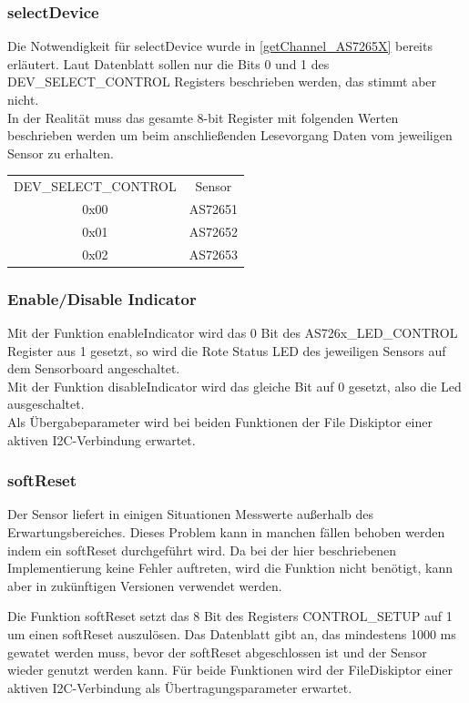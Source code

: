 \subsubsection{selectDevice}
Die Notwendigkeit für selectDevice wurde in \ref{getChannel_AS7265X} bereits erläutert.
Laut Datenblatt sollen nur die Bits 0 und 1 des DEV\_SELECT\_CONTROL Registers beschrieben werden, das stimmt aber nicht.\\
In der Realität muss das gesamte 8-bit Register mit folgenden Werten beschrieben werden um beim anschließenden Lesevorgang Daten vom jeweiligen Sensor zu erhalten.
\begin{center}
\begin{tabular}{ c c }
 	DEV\_SELECT\_CONTROL & Sensor \\ 
 	0x00 & AS72651 \\  
 	0x01 & AS72652 \\
 	0x02 & AS72653 \\  
\end{tabular}
\end{center}

\subsubsection{Enable/Disable Indicator}
Mit der Funktion enableIndicator wird das 0 Bit des AS726x\_LED\_CONTROL Register aus 1 gesetzt, so wird die Rote Status LED des jeweiligen Sensors auf dem Sensorboard angeschaltet.\\
Mit der Funktion disableIndicator wird das gleiche Bit auf 0 gesetzt, also die Led ausgeschaltet.\\
Als Übergabeparameter wird bei beiden Funktionen der File Diskiptor einer aktiven I2C-Verbindung erwartet.\\

\subsubsection{softReset}
Der Sensor liefert in einigen Situationen Messwerte außerhalb des Erwartungsbereiches.
Dieses Problem kann in manchen fällen behoben werden indem ein softReset durchgeführt wird.
Da bei der hier beschriebenen Implementierung keine Fehler auftreten, wird die Funktion nicht benötigt, kann aber in zukünftigen Versionen verwendet werden.

Die Funktion softReset setzt das 8 Bit des Registers CONTROL\_SETUP auf 1 um einen softReset auszulösen.
Das Datenblatt gibt an, das mindestens 1000 ms gewatet werden muss, bevor der softReset abgeschlossen ist und der Sensor wieder genutzt werden kann.
Für beide Funktionen wird der FileDiskiptor einer aktiven I2C-Verbindung als Übertragungsparameter erwartet.
